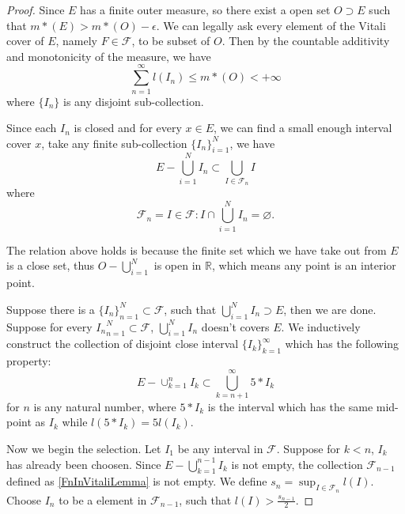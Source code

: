 \documentclass[lang=en, 12pt]{elegantbook}
\newcommand{\RR}{\mathbb{R}}
\begin{document}
        \begin{proof}
            Since $E$ has a finite outer measure, so there exist a open set $O \supset E$ such that $m*(E) > m*(O) -\epsilon$. We can legally
        ask every element of the Vitali cover of $E$, namely $F \in \mathcal{F}$, to be subset of $O$. Then by the countable additivity and monotonicity 
        of the measure, we have
        $$\sum_{n=1}^{\infty} l(I_n) \leq m*(O) < +\infty$$
        where $\{I_n\}$ is any disjoint sub-collection. \par
            Since each $I_n$ is closed and for every $x \in E$, we can find a small enough interval cover $x$, take any finite 
        sub-collection $\{I_n\}_{i=1}^{N}$, we have  
        $$E - \bigcup_{i=1}^{N} I_n \subset \bigcup_{I \in \mathcal{F}_n} I$$
        where 
        \begin{equation}\label{FnInVitaliLemma}
            \mathcal{F}_n = {I \in \mathcal{F}: I \cap \bigcup_{i=1}^{N} I_n = \varnothing}.
        \end{equation}\par
            \begin{remark}
                The relation above holds is because the finite set which we have take out from $E$ is a close set, thus $O - \bigcup_{i=1}^{N}$ 
        is open in $\RR$, which means any point is an interior point. 
            \end{remark}
            Suppose there is a $\{I_n\}_{n=1}^{N} \subset \mathcal{F}$, such that $\bigcup_{i=1}^{N} I_n \supset E$,
        then we are done. Suppose for every ${I_n}_{n=1}^{N} \subset \mathcal{F}$, $ \bigcup_{i=1}^{N} I_n$ doesn't covers $E$. We inductively
        construct the collection of disjoint close interval $\{I_k\}_{k=1}^{\infty}$ which has the following property:
        \begin{equation}\label{SubcollectionInVitaliLemma}
            E- \cup_{k=1}^{n} I_k \subset \bigcup_{k=n+1}^{\infty} 5*I_k
        \end{equation}
        for $n$ is any natural number, where $5*I_k$ is the interval which has the same mid-point as $I_k$ while $l(5*I_k) = 5l(I_k)$.\par
            Now we begin the selection. Let $I_1$ be any interval in $\mathcal{F}$. Suppose for $k <n$, $I_k$ has already been choosen. 
        Since $E- \bigcup_{k=1}^{n-1} I_k$ is not empty, the collection $\mathcal{F}_{n-1}$ defined as \eqref{FnInVitaliLemma} is not empty.
        We define $s_n = \sup_{I \in \mathcal{F}_n} l(I)$. Choose $I_n$ to be a element in $\mathcal{F}_{n-1}$, such that $l(I)> \frac{s_{n-1}}{2}$.\par

\end{proof}
\end{document}
